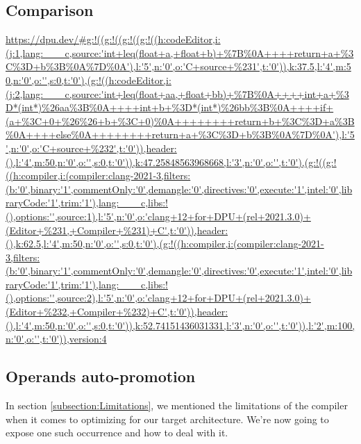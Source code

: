\subsection{Comparison}
\url{https://dpu.dev/#g:!((g:!((g:!((g:!((h:codeEditor,i:(j:1,lang:___c,source:'int+leq(float+a,+float+b)+%7B%0A++++return+a+%3C%3D+b%3B%0A%7D%0A'),l:'5',n:'0',o:'C+source+%231',t:'0')),k:37.5,l:'4',m:50,n:'0',o:'',s:0,t:'0'),(g:!((h:codeEditor,i:(j:2,lang:___c,source:'int+leq(float+aa,+float+bb)+%7B%0A++++int+a+%3D*(int*)%26aa%3B%0A++++int+b+%3D*(int*)%26bb%3B%0A++++if+(a+%3C+0+%26%26+b+%3C+0)%0A++++++++return+b+%3C%3D+a%3B%0A++++else%0A++++++++return+a+%3C%3D+b%3B%0A%7D%0A'),l:'5',n:'0',o:'C+source+%232',t:'0')),header:(),l:'4',m:50,n:'0',o:'',s:0,t:'0')),k:47.25848563968668,l:'3',n:'0',o:'',t:'0'),(g:!((g:!((h:compiler,i:(compiler:clang-2021-3,filters:(b:'0',binary:'1',commentOnly:'0',demangle:'0',directives:'0',execute:'1',intel:'0',libraryCode:'1',trim:'1'),lang:___c,libs:!(),options:'',source:1),l:'5',n:'0',o:'clang+12+for+DPU+(rel+2021.3.0)+(Editor+%231,+Compiler+%231)+C',t:'0')),header:(),k:62.5,l:'4',m:50,n:'0',o:'',s:0,t:'0'),(g:!((h:compiler,i:(compiler:clang-2021-3,filters:(b:'0',binary:'1',commentOnly:'0',demangle:'0',directives:'0',execute:'1',intel:'0',libraryCode:'1',trim:'1'),lang:___c,libs:!(),options:'',source:2),l:'5',n:'0',o:'clang+12+for+DPU+(rel+2021.3.0)+(Editor+%232,+Compiler+%232)+C',t:'0')),header:(),l:'4',m:50,n:'0',o:'',s:0,t:'0')),k:52.74151436031331,l:'3',n:'0',o:'',t:'0')),l:'2',m:100,n:'0',o:'',t:'0')),version:4}

\subsection{Operands auto-promotion}

In section \ref{subsection:Limitations}, we mentioned the limitations of the compiler when it comes to optimizing for our target architecture. We're now going to expose one such occurrence and how to deal with it.

